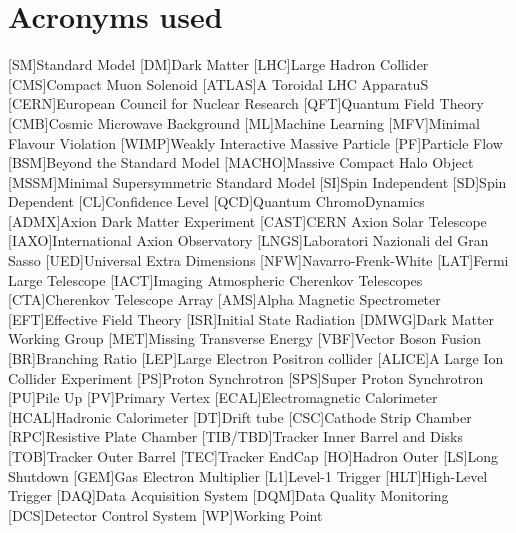 \documentclass[a4paper, 10pt, openright]{report}
\begin{document}
\chapter*{\huge{Acronyms used}}
\begin{multicols}{2}
\begin{acronym}

[SM]{Standard Model}
[DM]{Dark Matter}
[LHC]{Large Hadron Collider}
[CMS]{Compact Muon Solenoid}
[ATLAS]{A Toroidal LHC ApparatuS}
[CERN]{European Council for Nuclear Research}
[QFT]{Quantum Field Theory}
[CMB]{Cosmic Microwave Background}
[ML]{Machine Learning}
[MFV]{Minimal Flavour Violation}
[WIMP]{Weakly Interactive Massive Particle}
[PF]{Particle Flow}
[BSM]{Beyond the Standard Model}
[MACHO]{Massive Compact Halo Object}
[MSSM]{Minimal Supersymmetric Standard Model}
[SI]{Spin Independent}
[SD]{Spin Dependent}
[CL]{Confidence Level}
[QCD]{Quantum ChromoDynamics}
[ADMX]{Axion Dark Matter Experiment}
[CAST]{CERN Axion Solar Telescope}
[IAXO]{International Axion Observatory}
[LNGS]{Laboratori Nazionali del Gran Sasso}
[UED]{Universal Extra Dimensions}
[NFW]{Navarro-Frenk-White}
[LAT]{Fermi Large Telescope}
[IACT]{Imaging Atmospheric Cherenkov Telescopes}
[CTA]{Cherenkov Telescope Array}
[AMS]{Alpha Magnetic Spectrometer}
[EFT]{Effective Field Theory}
[ISR]{Initial State Radiation}
[DMWG]{Dark Matter Working Group}
[MET]{Missing Transverse Energy}
[VBF]{Vector Boson Fusion}
[BR]{Branching Ratio}
[LEP]{Large Electron Positron collider}
[ALICE]{A Large Ion Collider Experiment}
[PS]{Proton Synchrotron}
[SPS]{Super Proton Synchrotron}
[PU]{Pile Up}
[PV]{Primary Vertex}
[ECAL]{Electromagnetic Calorimeter}
[HCAL]{Hadronic Calorimeter}
[DT]{Drift tube}
[CSC]{Cathode Strip Chamber}
[RPC]{Resistive Plate Chamber}
[TIB/TBD]{Tracker Inner Barrel and Disks}
[TOB]{Tracker Outer Barrel}
[TEC]{Tracker EndCap} 
[HO]{Hadron Outer}
[LS]{Long Shutdown}
[GEM]{Gas Electron Multiplier}
[L1]{Level-1 Trigger}
[HLT]{High-Level Trigger}
[DAQ]{Data Acquisition System}
[DQM]{Data Quality Monitoring}
[DCS]{Detector Control System}
[WP]{Working Point}

\end{acronym}
\end{multicols}
\newpage
\end{document}
